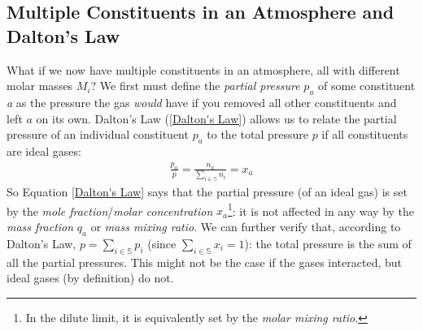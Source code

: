 \subsection{Multiple Constituents in an Atmosphere and Dalton's Law}\label{Multiple Dalt}

What if we now have multiple constituents in an atmosphere, all with different molar masses \(M_i\)? We first must define the \textit{partial pressure} \(p_a\) of some constituent \textit{a} as the pressure the gas \textit{would} have if you removed all other constituents and left \(a\) on its own. Dalton's Law (\ref{Dalton's Law}) allows us to relate the partial pressure of an individual constituent \(p_a\) to the total pressure \(p\) if all constituents are ideal gases:
\begin{align}\label{Dalton's Law}
    \boxed{\frac{p_a}{p}=\frac{n_a}{\sum\limits_{i\in\mathbb{S}} n_i}=x_a}
\end{align}
So Equation \ref{Dalton's Law} says that the partial pressure (of an ideal gas) is set by the \textit{mole fraction}/\textit{molar concentration} \(x_a\)\footnote{
    In the dilute limit, it is equivalently set by the \textit{molar mixing ratio}.
}: it is not affected in any way by the \textit{mass fraction} \(q_a\) or \textit{mass mixing ratio}. We can further verify that, according to Dalton's Law, \(p=\sum\limits_{i\in\mathbb{S}} p_i\) (since \(\sum\limits_{i\in\mathbb{S}} x_i=1\)): the total pressure is the sum of all the partial pressures. This might not be the case if the gases interacted, but ideal gases (by definition) do not.

